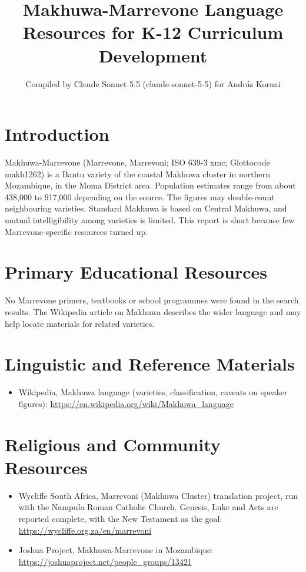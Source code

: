 \documentclass[12pt]{article}
\title{Makhuwa-Marrevone Language Resources for K-12 Curriculum Development}
\author{Compiled by Claude Sonnet 5.5 (claude-sonnet-5-5) for Andr\'as Kornai}
\date{}
\begin{document}
\maketitle

\section{Introduction}
Makhuwa-Marrevone (Marrevone, Marrevoni; ISO 639-3 xmc; Glottocode makh1262) is a Bantu variety of the coastal Makhuwa cluster in northern Mozambique, in the Moma District area. Population estimates range from about 438,000 to 917,000 depending on the source. The figures may double-count neighbouring varieties. Standard Makhuwa is based on Central Makhuwa, and mutual intelligibility among varieties is limited. This report is short because few Marrevone-specific resources turned up.

\section{Primary Educational Resources}
No Marrevone primers, textbooks or school programmes were found in the search results. The Wikipedia article on Makhuwa describes the wider language and may help locate materials for related varieties.

\section{Linguistic and Reference Materials}
\begin{itemize}
\item Wikipedia, Makhuwa language (varieties, classification, caveats on speaker figures): \url{https://en.wikipedia.org/wiki/Makhuwa_language}
\end{itemize}

\section{Religious and Community Resources}
\begin{itemize}
\item Wycliffe South Africa, Marrevoni (Makhuwa Cluster) translation project, run with the Nampula Roman Catholic Church. Genesis, Luke and Acts are reported complete, with the New Testament as the goal: \url{https://wycliffe.org.za/en/marrevoni}
\item Joshua Project, Makhuwa-Marrevone in Mozambique: \url{https://joshuaproject.net/people_groups/13421}
\end{itemize}
\end{document}
